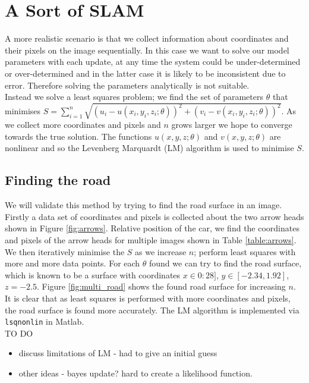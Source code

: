 \documentclass[12pt]{article}
\begin{document}

\section{A Sort of SLAM}

A more realistic scenario is that we collect information about coordinates and their pixels on the image sequentially. In this case we want to solve our model parameters with each update, at any time the system could be under-determined or over-determined and in the latter case it is likely to be inconsistent due to error. Therefore solving the parameters analytically is not suitable. \\

Instead we solve a least squares problem; we find the set of parameters $\theta$ that minimises $S = \sum_{i=1}^n \sqrt{(u_i - u(x_i,y_i,z_i;\theta))^2 + (v_i - v(x_i,y_i,z_i;\theta))^2}$. As we collect more coordinates and pixels and $n$ grows larger we hope to converge towards the true solution. The functions $u(x,y,z;\theta)$ and $v(x,y,z;\theta)$ are nonlinear and so the Levenberg Marquardt (LM) algorithm is used to minimise $S$.

\subsection{Finding the road}

We will validate this method by trying to find the road surface in an image. Firstly a data set of coordinates and pixels is collected about the two arrow heads shown in Figure \ref{fig:arrows}. Relative position of the car, we find the coordinates and pixels of the arrow heads for multiple images shown in Table \ref{table:arrows}. We then iteratively minimise the $S$ as we increase $n$; perform least squares with more and more data points. For each $\theta$ found we can try to find the road surface, which is known to be a surface with coordinates  $x \in {0:28]}$, $y \in {[-2.34,1.92]}$, $z=-2.5$. Figure \ref{fig:multi_road} shows the found road surface for increasing $n$. It is clear that as least squares is performed with more coordinates and pixels, the road surface is found more accurately. The LM algorithm is implemented via \texttt{lsqnonlin} in Matlab.\\

TO DO
\begin{itemize}
\item discuss limitations of LM - had to give an initial guess
\item other ideas - bayes update? hard to create a likelihood function.
\end{itemize}
\end{document}
